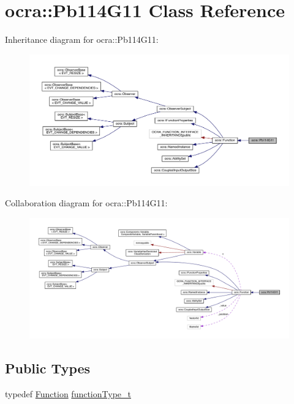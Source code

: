 \hypertarget{classocra_1_1Pb114G11}{}\section{ocra\+:\+:Pb114\+G11 Class Reference}
\label{classocra_1_1Pb114G11}


Inheritance diagram for ocra\+:\+:Pb114\+G11\+:\nopagebreak
\begin{figure}[H]
\begin{center}
\leavevmode
\includegraphics[width=350pt]{d4/d84/classocra_1_1Pb114G11__inherit__graph}
\end{center}
\end{figure}


Collaboration diagram for ocra\+:\+:Pb114\+G11\+:\nopagebreak
\begin{figure}[H]
\begin{center}
\leavevmode
\includegraphics[width=350pt]{da/d07/classocra_1_1Pb114G11__coll__graph}
\end{center}
\end{figure}
\subsection*{Public Types}
\begin{DoxyCompactItemize}
\item 
typedef \hyperlink{classocra_1_1Function}{Function} \hyperlink{classocra_1_1Pb114G11_a6a78a86715026be7613e399955407e93}{function\+Type\+\_\+t}
\end{DoxyCompactItemize}
